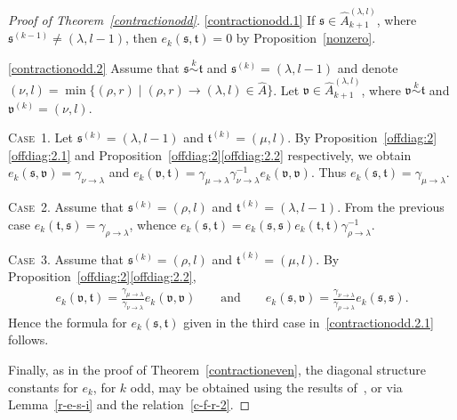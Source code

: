 \documentclass[11pt,a4paper,reqno,svgnames]{amsart}
\theoremstyle{plain}
\theoremstyle{definition}
\numberwithin{equation}{section}
\begin{document}
\begin{proof}[Proof of Theorem~\ref{contractionodd}] 
\eqref{contractionodd.1} If $\mathfrak{s}\in\hat{A}_{k+1}^{(\lambda,l)}$, where $\mathfrak{s}^{(k-1)}\ne(\lambda,l-1)$, then $e_k(\mathfrak{s,t})=0$ by Proposition~\ref{nonzero}. 

\eqref{contractionodd.2} Assume that $\mathfrak{s}\stackrel{k}{\sim}\mathfrak{t}$ and $\mathfrak{s}^{(k)}=(\lambda,l-1)$ and denote $(\nu,l)=\min\lbrace(\rho,r)\mid (\rho,r)\to(\lambda,l)\in\hat{A}\rbrace$. Let $\mathfrak{v}\in\widehat{A}_{k+1}^{(\lambda,l)}$, where $\mathfrak{v}\stackrel{k}{\sim}\mathfrak{t}$ and $\mathfrak{v}^{(k)}=(\nu,l)$. 

{\textsc{Case~1.}} Let $\mathfrak{s}^{(k)}=(\lambda,l-1)$ and $\mathfrak{t}^{(k)}=(\mu,l)$. By Proposition~\ref{offdiag:2}\eqref{offdiag:2.1} and Proposition~\ref{offdiag:2}\eqref{offdiag:2.2} respectively, we obtain $e_k(\mathfrak{s,v})=\gamma_{\nu\to\lambda}$ and $e_k(\mathfrak{v,t})=\gamma_{\mu\to\lambda}\gamma_{\nu\to \lambda}^{-1}e_k(\mathfrak{v,v})$. Thus $e_k(\mathfrak{s,t})=\gamma_{\mu\to\lambda}$. 

{\textsc{Case~2.}} Assume that $\mathfrak{s}^{(k)}=(\rho,l)$ and $\mathfrak{t}^{(k)}=(\lambda,l-1)$. From the previous case $e_k(\mathfrak{t,s})=\gamma_{\rho\to\lambda}$, whence  $e_k(\mathfrak{s,t})=e_k(\mathfrak{s,s}) e_k(\mathfrak{t,t})\gamma_{\rho\to\lambda}^{-1}$. 

{\textsc{Case~3.}} Assume that $\mathfrak{s}^{(k)}=(\rho,l)$ and $\mathfrak{t}^{(k)}=(\mu,l)$. By Proposition~\ref{offdiag:2}\eqref{offdiag:2.2},
\begin{align*}
e_k(\mathfrak{v,t})=\frac{\gamma_{\mu\to\lambda}}{ \gamma_{\nu\to\lambda}}e_k(\mathfrak{v,v})\qquad\text{and}\qquad e_k(\mathfrak{s,v})=\frac{\gamma_{\nu\to\lambda}}{\gamma_{\rho\to\lambda}}e_k(\mathfrak{s,s}).
\end{align*}
Hence the formula for $e_k(\mathfrak{s,t})$ given in the third case in~\eqref{contractionodd.2.1} follows. 

Finally, as in the proof of Theorem~\ref{contractioneven}, the diagonal structure constants for $e_k$, for $k$ odd, may be obtained using the results of~\cite{MR1427801,MR2143201}, or via Lemma~\ref{r-e-s-i} and the relation~\eqref{c-f-r-2}. 
\end{proof}
\end{document}
